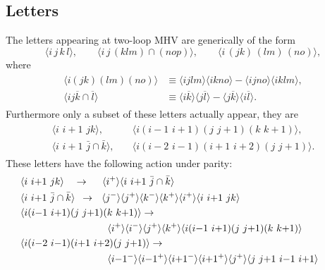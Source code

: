 \documentclass[12pt]{article}
\def\ket#1{\langle #1 \rangle}
\begin{document}
\thispagestyle{fancyplain}
 
\fancyhf{}
 
\cfoot{\fancyplain{}{\thepage}}


\subsection*{Letters}
The letters appearing at two-loop MHV are generically of the form
\begin{equation}\label{def:lettersGeneric}
\ket{i\,j\,k\,l}, \qquad
\ket{i\,j\,(klm)\cap(nop)},\qquad
\ket{i\,(jk)\,(lm)\,(no)},
\end{equation}
where 
\begin{align}
\begin{split}
	\ket{i(jk)(lm)(no)} &\equiv \ket{ijlm}\ket{ikno} - \ket{ijno} \ket{iklm},\\
	\ket{ij\overline{k} \cap \overline{l}} &\equiv \ket{i\overline{k}}\ket{j\overline{l}} - \ket{j\overline{k}}\ket{i\overline{l}}.
\end{split}
\end{align} 
Furthermore only a subset of these letters actually appear, they are
\begin{align}\label{def:letters}
\begin{split}
\ket{i\,\,i{+}1\,\,jk},& \quad 
\ket{i(i{-}1\,\,i{+}1)(j\,\,j{+}1)(k\,\,k{+}1)}, \\ 
\ket{i\,\,i{+}1\,\,\bar{j}\cap\bar{k}},& \quad
\ket{i(i{-}2\,\,i{-}1)(i{+}1\,\,i{+}2)(j\,\,j{+}1)}.
\end{split}
\end{align}
These letters have the following action under parity:
\begin{align}\label{eq:conjRules}
\begin{split}
&\hspace{-1cm}\ket{i\,\,i{+}1\,\,jk}\quad\to\quad\,\,\ket{i^+}\ket{i\,\,i{+}1\,\,\bar{j}\cap\bar{k}}\\
&\hspace{-1cm}\ket{i\,\,i{+}1\,\,\bar{j}\cap\bar{k}}\,\,\,\to\,\,\,\,\ket{j^{-}}\ket{j^{+}}\ket{k^{-}}\ket{k^{+}}\ket{i^{+}}\ket{i\,\,i{+}1\,\,jk}\\
&\hspace{-1cm}\ket{i(i{-}1\,\,i{+}1)(j\,\,j{+}1)(k\,\,k{+}1)}\to\\&\qquad\qquad\qquad\ket{i^+}\ket{i^-}\ket{j^+}\ket{k^+}\ket{i(i{-}1\,\,i{+}1)(j\,\,j{+}1)(k\,\,k{+}1)}\\
&\hspace{-1cm}\ket{i(i{-}2\,\,i{-}1)(i{+}1\,\,i{+}2)(j\,\,j{+}1)}\to\\&\qquad\qquad\qquad\ket{i{-}1^-}\ket{i{-}1^+}\ket{i{+}1^-}\ket{i{+}1^+}\ket{j^+}\ket{j\,\,j{+}1\,\,i{-}1\,\,i{+}1}
\end{split}
\end{align}
\end{document}
